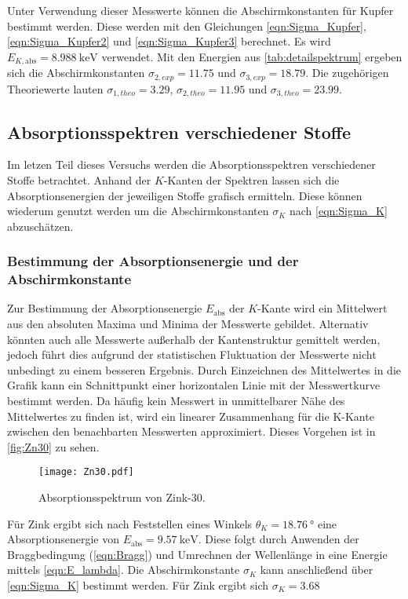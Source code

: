 Unter Verwendung dieser Messwerte können die Abschirmkonstanten für Kupfer bestimmt werden. Diese werden mit den Gleichungen 
\eqref{eqn:Sigma_Kupfer}, \eqref{eqn:Sigma_Kupfer2} und \eqref{eqn:Sigma_Kupfer3} berechnet. Es wird $E_{K,\text{abs}} = \qty{8.988}{\kilo\electronvolt}$ \cite{NIST}
verwendet. Mit den Energien aus \autoref{tab:detailspektrum} ergeben sich die Abschirmkonstanten $\sigma_{2,exp} = 11.75$ und 
$\sigma_{3,exp} = 18.79$. Die zugehörigen Theoriewerte lauten $\sigma_{1,theo} = 3.29$, $\sigma_{2,theo} = 11.95$ und 
$\sigma_{3,theo} = 23.99$.

\subsection{Absorptionsspektren verschiedener Stoffe}
\label{subsec:A_Absorption}
Im letzen Teil dieses Versuchs werden die Absorptionsspektren verschiedener Stoffe betrachtet. Anhand der $K$-Kanten der Spektren lassen sich die Absorptionsenergien 
der jeweiligen Stoffe grafisch ermitteln. Diese können wiederum genutzt werden um die Abschirmkonstanten $\sigma_K$ nach \autoref{eqn:Sigma_K} abzuschätzen.

\subsubsection{Bestimmung der Absorptionsenergie und der Abschirmkonstante}
Zur Bestimmung der Absorptionsenergie $E_\text{abs}$ der $K$-Kante wird ein Mittelwert aus den absoluten Maxima und Minima der Messwerte gebildet.
Alternativ könnten auch alle Messwerte außerhalb der Kantenstruktur gemittelt werden, jedoch führt dies aufgrund der statistischen Fluktuation der Messwerte nicht
unbedingt zu einem besseren Ergebnis. Durch Einzeichnen des Mittelwertes in die Grafik kann ein Schnittpunkt einer horizontalen Linie mit der Messwertkurve bestimmt werden.
Da häufig kein Messwert in unmittelbarer Nähe des Mittelwertes zu finden ist, wird ein linearer Zusammenhang für die K-Kante zwischen den benachbarten Messwerten
approximiert. Dieses Vorgehen ist in \autoref{fig:Zn30} zu sehen.

\begin{figure}
  \centering
  \texttt{[image: Zn30.pdf]}
  \caption{Absorptionsspektrum von Zink-30.}
  \label{fig:Zn30}
\end{figure}

Für Zink ergibt sich nach Feststellen eines Winkels $\theta_K = \qty{18.76}{\degree}$ eine Absorptionsenergie von $E_\text{abs} = \qty{9.57}{\kilo\electronvolt}$.
Diese folgt durch Anwenden der Braggbedingung (\autoref{eqn:Bragg}) und Umrechnen der Wellenlänge in eine Energie mittels \autoref{eqn:E_lambda}.
Die Abschirmkonstante $\sigma_K$ kann anschließend über \autoref{eqn:Sigma_K} bestimmt werden. 
Für Zink ergibt sich $\sigma_K = 3.68$

